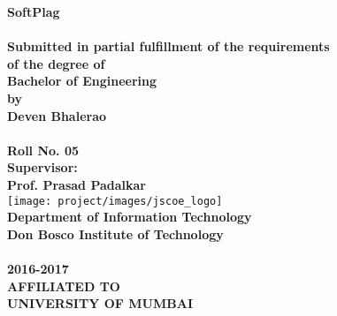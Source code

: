 \newpage
\begin{center}
\thispagestyle{empty}
\LARGE{\textbf{SoftPlag}}\\[0.5cm]
\vspace{0.5cm}
\Large{\textbf{\\Submitted in partial fulfillment of the requirements}}
\vspace{0.5cm}
\Large{\textbf{\\of the degree of}}
\vspace{0.5cm}
\LARGE{\textbf{\\Bachelor of Engineering}}
\vspace{0.5cm}
\Large{\textbf{\\by}}
\vspace{0.5cm}
\Large{\textbf{\\Deven Bhalerao\\}}
\Large{\textbf{\\Roll No. 05 \\}}
\vspace{0.5cm}
\Large{\textbf{Supervisor:}}\\
\vspace{0.5cm}
\Large{\textbf{Prof. Prasad Padalkar}}\\
\vspace{1cm}
\texttt{[image: project/images/jscoe\_logo]}\\
\vspace{1cm}
\Large{\textbf{Department of Information Technology}}\\
\vspace{0.5cm}
\Large{\textbf{Don Bosco Institute of Technology}}\\
\large{\textbf{\\2016-2017}}\\
\vspace{1cm}
\Large{\textbf{AFFILIATED TO\\}}
\vspace{0.5cm}
\LARGE{\textbf{UNIVERSITY OF MUMBAI}}
\newpage
\end{center}